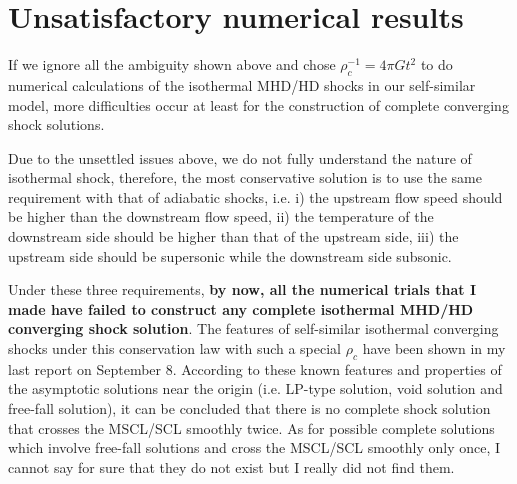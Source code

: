 \documentclass[fleqn,usenatbib]{mnras}
\begin{document}
\section{Unsatisfactory numerical results}
If we ignore all the ambiguity shown above and chose $\rho^{-1}_{c}=4\pi G t^{2}$ to do numerical calculations of the isothermal MHD/HD shocks in our self-similar model, more difficulties occur at least for the construction of complete converging shock solutions. 

Due to the unsettled issues above, we do not fully understand the nature of isothermal shock, therefore, the most conservative solution is to use the same requirement with that of adiabatic shocks, i.e. i) the upstream flow speed should be higher than the downstream flow speed, ii) the temperature of the downstream side should be higher than that of the upstream side, iii) the upstream side should be supersonic while the downstream side subsonic. 

Under these three requirements, \textbf{by now, all the numerical trials that I made have failed to construct any complete isothermal MHD/HD converging shock solution}. The features of self-similar isothermal converging shocks under this conservation law with such a special $\rho_{c}$ have been shown in my last report on September 8. According to these known features and properties of the asymptotic solutions near the origin (i.e. LP-type solution, void solution and free-fall solution), it can be concluded that there is no complete shock solution that crosses the MSCL/SCL smoothly twice. As for possible complete solutions which involve free-fall solutions and cross the MSCL/SCL smoothly only once, I cannot say for sure that they do not exist but I really did not find them.


 

\label{lastpage}
\end{document}
